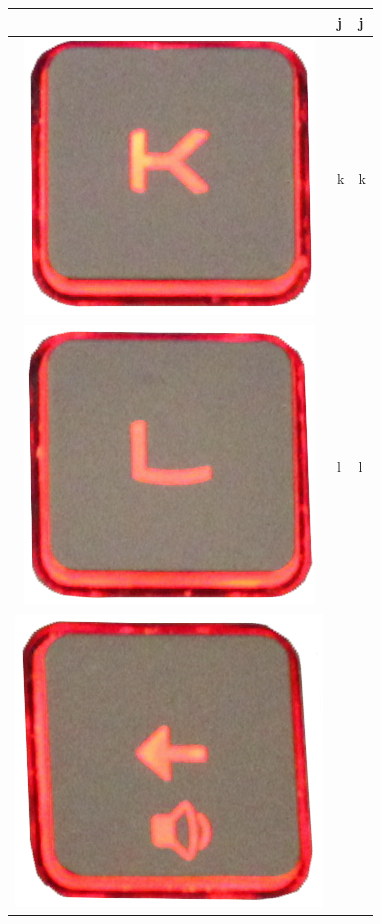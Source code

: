 \begin{longtable}{|cll|}
\begin{minipage}[c]{.3\textwidth}
\vspace{0.2cm}
\end{minipage} & j & j\\
\hline
\begin{minipage}[c]{.3\textwidth}
\vspace{0.2cm}
\includegraphics[scale=0.06]{Images/KeyMapping/k}
\vspace{0.2cm}
\end{minipage} & k & k\\
\hline
\begin{minipage}[c]{.3\textwidth}
\vspace{0.2cm}
\includegraphics[scale=0.06]{Images/KeyMapping/l}
\vspace{0.2cm}
\end{minipage} & l & l\\
\hline
\begin{minipage}[c]{.3\textwidth}
\vspace{0.2cm}
\includegraphics[scale=0.06]{Images/KeyMapping/LEFT}

\end{minipage}
\end{longtable}
